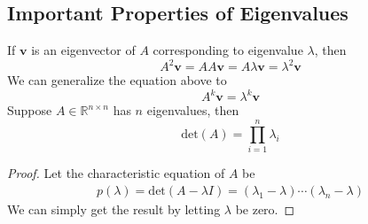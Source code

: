     \subsection{Important Properties of Eigenvalues}
    If $\mathbf{v}$ is an eigenvector of $A$ corresponding to eigenvalue $\lambda$, then
    \begin{equation*}
        A^2\mathbf{v} = AA\mathbf{v} = A\lambda \mathbf{v} = \lambda ^2 \mathbf{v}
    \end{equation*}
    We can generalize the equation above to 
    \begin{equation}
        A^k\mathbf{v} = \lambda ^k \mathbf{v}
    \end{equation}
    Suppose $A\in \mathbb{R}^{n\times n}$ has $n$ eigenvalues, then
    \begin{equation}
        \text{det}(A) = \prod_{i = 1}^n \lambda_i
    \end{equation}
    \begin{proof}
        Let the characteristic equation of $A$ be
        \begin{align*}
            p(\lambda) = \text{det}(A - \lambda I) = (\lambda_1 - \lambda)\cdots (\lambda_n - \lambda)
        \end{align*}
        We can simply get the result by letting $\lambda$ be zero.
    \end{proof}


